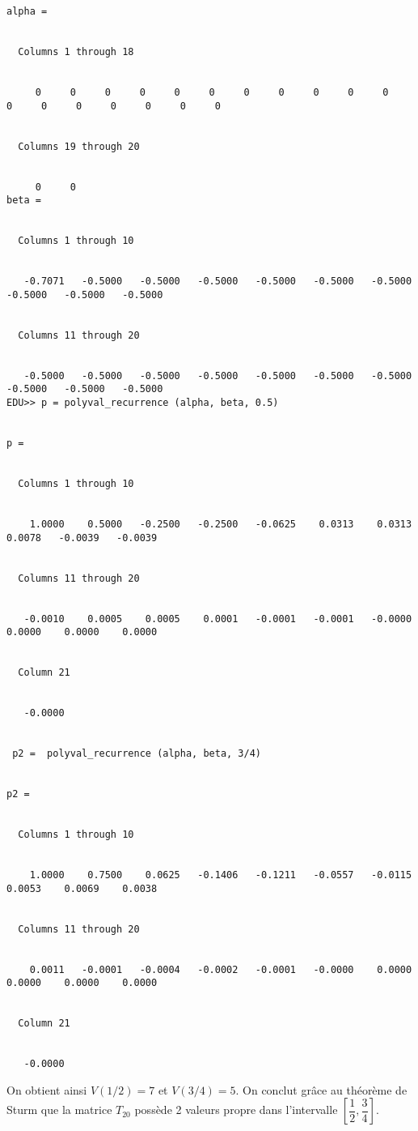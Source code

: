 \begin{verbatim}
alpha =


  Columns 1 through 18


     0     0     0     0     0     0     0     0     0     0     0     0     0     0     0     0     0     0


  Columns 19 through 20


     0     0
beta =


  Columns 1 through 10


   -0.7071   -0.5000   -0.5000   -0.5000   -0.5000   -0.5000   -0.5000   -0.5000   -0.5000   -0.5000


  Columns 11 through 20


   -0.5000   -0.5000   -0.5000   -0.5000   -0.5000   -0.5000   -0.5000   -0.5000   -0.5000   -0.5000
EDU>> p = polyval_recurrence (alpha, beta, 0.5)


p =


  Columns 1 through 10


    1.0000    0.5000   -0.2500   -0.2500   -0.0625    0.0313    0.0313    0.0078   -0.0039   -0.0039


  Columns 11 through 20


   -0.0010    0.0005    0.0005    0.0001   -0.0001   -0.0001   -0.0000    0.0000    0.0000    0.0000


  Column 21


   -0.0000


 p2 =  polyval_recurrence (alpha, beta, 3/4)


p2 =


  Columns 1 through 10


    1.0000    0.7500    0.0625   -0.1406   -0.1211   -0.0557   -0.0115    0.0053    0.0069    0.0038


  Columns 11 through 20


    0.0011   -0.0001   -0.0004   -0.0002   -0.0001   -0.0000    0.0000    0.0000    0.0000    0.0000


  Column 21


   -0.0000
\end{verbatim}


On obtient ainsi $V(1/2) = 7$ et $V(3/4) = 5$. On conclut grâce au théorème de Sturm que la matrice $T_{20}$ possède 2 valeurs propre dans l'intervalle $\left[ \dfrac{1}{2} , \dfrac{3}{4} \right]$. 



